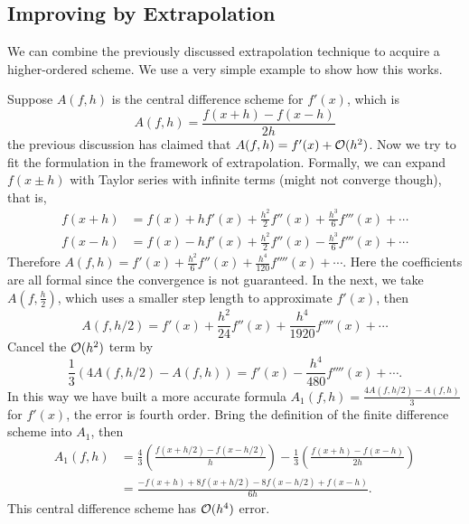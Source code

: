 \subsection{Improving by Extrapolation}
\label{SSec: 3-Imp-by-Ext}
We can combine the previously discussed extrapolation technique to acquire a higher-ordered scheme. We use a very simple example to show how this works. 
\begin{example}
    Suppose $A(f, h)$ is the central difference scheme for $f'(x)$, which is 
    \begin{equation}
        A(f, h) = \frac{f(x + h) - f(x- h)}{2h}
    \end{equation}
    the previous discussion has claimed that $A(f, h) = f'(x) + \mathcal O(h^2)$. Now we try to fit the formulation in the framework of extrapolation. Formally, we can expand $f(x\pm h)$ with Taylor series with infinite terms (might not converge though), that is, 
    \begin{equation}
        \begin{aligned}
            f(x + h) &= f(x) + h f'(x) + \frac{h^2}{2} f''(x) + \frac{h^3}{6} f'''(x) + \cdots \\
            f(x - h) &= f(x) - h f'(x) + \frac{h^2}{2} f''(x) - \frac{h^3}{6} f'''(x) + \cdots 
        \end{aligned}
    \end{equation}
    Therefore $A(f, h) = f'(x) + \frac{h^2}{6} f''(x) + \frac{h^4}{120}f''''(x) + \cdots $. Here the coefficients are all formal since the convergence is not guaranteed. In the next, we take $A(f, \frac{h}{2})$, which uses a smaller step length to approximate $f'(x)$, then 
    \begin{equation}
        A(f, h/2) =  f'(x) + \frac{h^2}{24} f''(x) + \frac{h^4}{1920}f''''(x) + \cdots
    \end{equation}
    Cancel the $\mathcal O(h^2)$ term by $$\frac{1}{3}\left( 4 A(f, h/2) - A(f, h) \right) =  f'(x) - \frac{h^4}{480} f''''(x) +\cdots. $$
    In this way we have built a more accurate  formula $A_1(f, h) = \frac{4 A(f, h/2) - A(f, h)}{3}$ for $f'(x)$, the error is fourth order. Bring the definition of the finite difference scheme into $A_1$, then 
    \begin{equation}
        \begin{aligned}
        A_1(f, h) &= \frac{4}{3} \left(\frac{f(x + h/2) - f(x - h/2)}{h}\right) - \frac{1}{3} \left(\frac{f(x + h) - f(x - h)}{2h}\right) \\
        &= \frac{-f(x+ h) + 8 f(x + h/2) - 8 f(x - h/2) + f(x - h)}{6h}.
        \end{aligned}
    \end{equation}
    This central difference scheme has $\mathcal O(h^4)$ error. 
\end{example}

